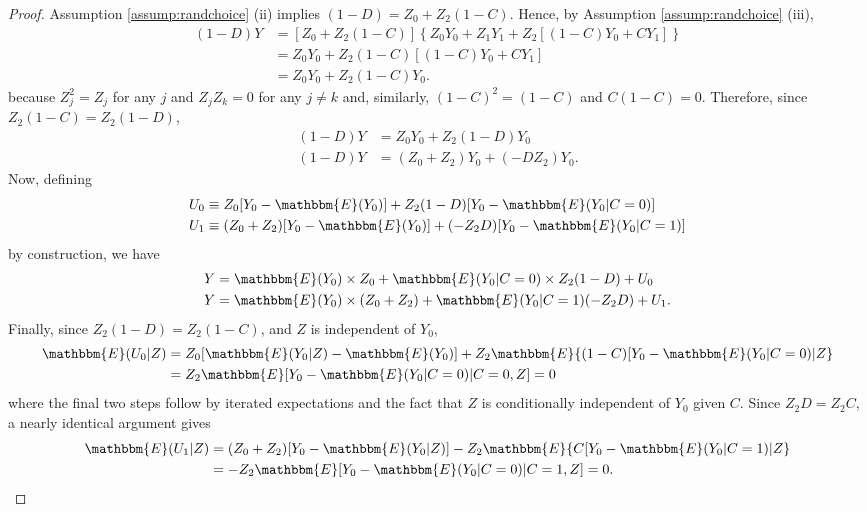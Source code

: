 \begin{proof}
Assumption \ref{assump:randchoice} (ii) implies $(1 - D) = Z_0 + Z_2(1 - C)$. Hence, by Assumption \ref{assump:randchoice} (iii),
\begin{align*}
(1 - D)Y &=  [Z_0 + Z_2 (1 - C)]\left\{Z_0 Y_0 + Z_1 Y_1 + Z_2[(1 - C) Y_0 + CY_1]\right\}\\
&= Z_0 Y_0 + Z_2 (1 - C) [(1 - C) Y_0 + C Y_1]\\
&= Z_0 Y_0 + Z_2 (1 - C) Y_0.
\end{align*}
because $Z_j^2 = Z_j$ for any $j$ and $Z_j Z_k = 0$ for any $j \neq k$ and, similarly, $(1 - C)^2 = (1 - C)$ and $C (1 - C) = 0$.
Therefore, since $Z_2 (1 - C) = Z_2 (1 - D)$,
\begin{align*}
(1 - D)Y &= Z_0 Y_0 + Z_2 (1 - D) Y_0\\
(1 - D)Y &= (Z_0 + Z_2) Y_0 + (-DZ_2) Y_0. 
\end{align*}
Now, defining
\begin{align*}
U_0 &\equiv Z_0 [Y_0 - \mathbbm{E}(Y_0)] + Z_2(1 - D)[Y_0 - \mathbbm{E}(Y_0|C=0)]\\
U_1 &\equiv (Z_0 + Z_2)[Y_0 - \mathbbm{E}(Y_0)] + (-Z_2 D)[Y_0 - \mathbbm{E}(Y_0|C=1)]
\end{align*}
by construction, we have
\begin{align*}
Y &= \mathbbm{E}(Y_0) \times Z_0 + \mathbbm{E}(Y_0|C=0) \times Z_2(1 - D) + U_0\\
Y &= \mathbbm{E}(Y_0) \times (Z_0 + Z_2)+ \mathbbm{E}(Y_0|C=1) (-Z_2D) + U_1.
\end{align*}
Finally, since $Z_2(1-D) = Z_2(1 - C)$, and $Z$ is independent of $Y_0$,  
\begin{align*}
\mathbbm{E}(U_0|Z) &= Z_0[\mathbbm{E}(Y_0|Z) - \mathbbm{E}(Y_0)] + Z_2\mathbbm{E}\{(1 - C) [Y_0 - \mathbbm{E}(Y_0|C=0) |Z\}\\
&= Z_2 \mathbbm{E}[Y_0 - \mathbbm{E}(Y_0|C=0) | C = 0, Z] = 0
\end{align*}
where the final two steps follow by iterated expectations and the fact that  $Z$ is conditionally independent of $Y_0$ given $C$. 
Since $Z_2 D = Z_2 C$, a nearly identical argument gives
\begin{align*}
\mathbbm{E}(U_1|Z) &= (Z_0 + Z_2)[Y_0 - \mathbbm{E}(Y_0|Z)] -Z_2\mathbbm{E}\{C [Y_0 - \mathbbm{E}(Y_0|C=1) |Z\}\\
&= -Z_2 \mathbbm{E}[Y_0 - \mathbbm{E}(Y_0|C=0) | C = 1, Z] = 0. \qedhere
\end{align*}
\end{proof}


